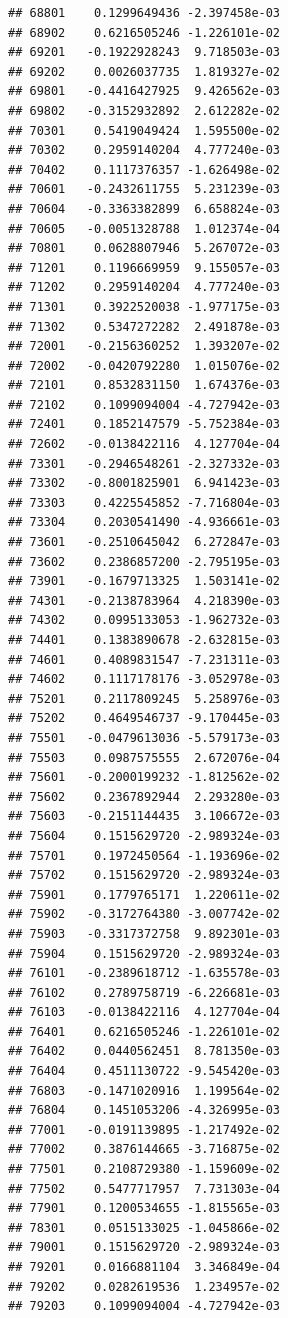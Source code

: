 \begin{frame}[fragile]
\begin{verbatim}
## 68801    0.1299649436 -2.397458e-03
## 68902    0.6216505246 -1.226101e-02
## 69201   -0.1922928243  9.718503e-03
## 69202    0.0026037735  1.819327e-02
## 69801   -0.4416427925  9.426562e-03
## 69802   -0.3152932892  2.612282e-02
## 70301    0.5419049424  1.595500e-02
## 70302    0.2959140204  4.777240e-03
## 70402    0.1117376357 -1.626498e-02
## 70601   -0.2432611755  5.231239e-03
## 70604   -0.3363382899  6.658824e-03
## 70605   -0.0051328788  1.012374e-04
## 70801    0.0628807946  5.267072e-03
## 71201    0.1196669959  9.155057e-03
## 71202    0.2959140204  4.777240e-03
## 71301    0.3922520038 -1.977175e-03
## 71302    0.5347272282  2.491878e-03
## 72001   -0.2156360252  1.393207e-02
## 72002   -0.0420792280  1.015076e-02
## 72101    0.8532831150  1.674376e-03
## 72102    0.1099094004 -4.727942e-03
## 72401    0.1852147579 -5.752384e-03
## 72602   -0.0138422116  4.127704e-04
## 73301   -0.2946548261 -2.327332e-03
## 73302   -0.8001825901  6.941423e-03
## 73303    0.4225545852 -7.716804e-03
## 73304    0.2030541490 -4.936661e-03
## 73601   -0.2510645042  6.272847e-03
## 73602    0.2386857200 -2.795195e-03
## 73901   -0.1679713325  1.503141e-02
## 74301   -0.2138783964  4.218390e-03
## 74302    0.0995133053 -1.962732e-03
## 74401    0.1383890678 -2.632815e-03
## 74601    0.4089831547 -7.231311e-03
## 74602    0.1117178176 -3.052978e-03
## 75201    0.2117809245  5.258976e-03
## 75202    0.4649546737 -9.170445e-03
## 75501   -0.0479613036 -5.579173e-03
## 75503    0.0987575555  2.672076e-04
## 75601   -0.2000199232 -1.812562e-02
## 75602    0.2367892944  2.293280e-03
## 75603   -0.2151144435  3.106672e-03
## 75604    0.1515629720 -2.989324e-03
## 75701    0.1972450564 -1.193696e-02
## 75702    0.1515629720 -2.989324e-03
## 75901    0.1779765171  1.220611e-02
## 75902   -0.3172764380 -3.007742e-02
## 75903   -0.3317372758  9.892301e-03
## 75904    0.1515629720 -2.989324e-03
## 76101   -0.2389618712 -1.635578e-03
## 76102    0.2789758719 -6.226681e-03
## 76103   -0.0138422116  4.127704e-04
## 76401    0.6216505246 -1.226101e-02
## 76402    0.0440562451  8.781350e-03
## 76404    0.4511130722 -9.545420e-03
## 76803   -0.1471020916  1.199564e-02
## 76804    0.1451053206 -4.326995e-03
## 77001   -0.0191139895 -1.217492e-02
## 77002    0.3876144665 -3.716875e-02
## 77501    0.2108729380 -1.159609e-02
## 77502    0.5477717957  7.731303e-04
## 77901    0.1200534655 -1.815565e-03
## 78301    0.0515133025 -1.045866e-02
## 79001    0.1515629720 -2.989324e-03
## 79201    0.0166881104  3.346849e-04
## 79202    0.0282619536  1.234957e-02
## 79203    0.1099094004 -4.727942e-03

\end{verbatim}
\end{frame}
